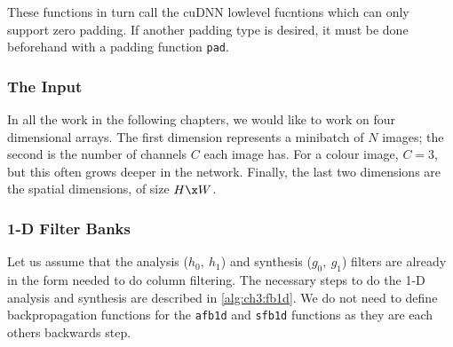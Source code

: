 These functions in turn call the cuDNN lowlevel fucntions which can only support
zero padding. If another padding type is desired, it must be done beforehand
with a padding function \texttt{pad}.

\subsubsection{The Input}
In all the work in the following chapters, we would like to work on four
dimensional arrays. The first dimension represents a minibatch of $N$ images;
the second is the number of channels $C$ each image has. For a colour image,
$C=3$, but this often grows deeper in the network. Finally, the last two
dimensions are the spatial dimensions, of size $H\x W$. 

\subsubsection{1-D Filter Banks}
Let us assume that the analysis ($h_0,\ h_1$) and synthesis ($g_0,\ g_1$)
filters are already in the form needed to do column filtering. The necessary
steps to do the 1-D analysis and synthesis are described in
\autoref{alg:ch3:fb1d}. We do not need to define backpropagation functions for the
\texttt{afb1d} and \texttt{sfb1d} functions as they are each others backwards
step.

